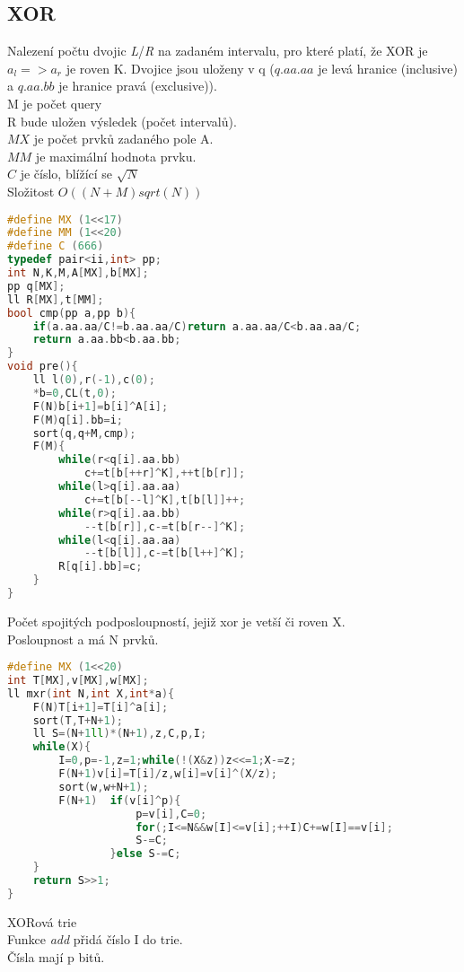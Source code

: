 \documentclass[11pt]{article}
\begin{document}
\subsection{XOR}
Nalezení počtu dvojic \textit{L}/\textit{R} na zadaném intervalu, pro které platí, že XOR je $a_l => a_r$ je roven \textsf{K}. Dvojice jsou uloženy v \textsf{q} ($q.aa.aa$ je levá hranice (inclusive) a $q.aa.bb$ je hranice pravá (exclusive)). 
\\\textsf{M} je počet query
\\\textsf{R} bude uložen výsledek (počet intervalů).
\\$MX$ je počet prvků zadaného pole \textsf{A}.
\\$MM$ je maximální hodnota prvku.
\\$C$ je číslo, blížící se $\sqrt{N}$
\\Složitost $O((N+M)sqrt(N))$ 
\begin{lstlisting}[language=C++]
#define MX (1<<17)
#define MM (1<<20)
#define C (666)
typedef pair<ii,int> pp;
int N,K,M,A[MX],b[MX];
pp q[MX];
ll R[MX],t[MM];
bool cmp(pp a,pp b){
    if(a.aa.aa/C!=b.aa.aa/C)return a.aa.aa/C<b.aa.aa/C;
    return a.aa.bb<b.aa.bb;
}
void pre(){
    ll l(0),r(-1),c(0);
    *b=0,CL(t,0);
    F(N)b[i+1]=b[i]^A[i];
    F(M)q[i].bb=i;
    sort(q,q+M,cmp);
    F(M){
        while(r<q[i].aa.bb)
            c+=t[b[++r]^K],++t[b[r]];
        while(l>q[i].aa.aa)
            c+=t[b[--l]^K],t[b[l]]++;
        while(r>q[i].aa.bb)
            --t[b[r]],c-=t[b[r--]^K];
        while(l<q[i].aa.aa)
            --t[b[l]],c-=t[b[l++]^K];
        R[q[i].bb]=c;    
    }
}
\end{lstlisting}
Počet spojitých podposloupností, jejiž xor je vetší či roven \textsf{X}.
\\Posloupnost \textsf{a} má \textsf{N} prvků.
\begin{lstlisting}[language=C++]
#define MX (1<<20)
int T[MX],v[MX],w[MX];
ll mxr(int N,int X,int*a){
    F(N)T[i+1]=T[i]^a[i];
    sort(T,T+N+1);
    ll S=(N+1ll)*(N+1),z,C,p,I;
    while(X){
        I=0,p=-1,z=1;while(!(X&z))z<<=1;X-=z;
        F(N+1)v[i]=T[i]/z,w[i]=v[i]^(X/z);
        sort(w,w+N+1);
        F(N+1)  if(v[i]^p){
                    p=v[i],C=0;
                    for(;I<=N&&w[I]<=v[i];++I)C+=w[I]==v[i];
                    S-=C;
                }else S-=C;
    }
    return S>>1;
}
\end{lstlisting}
XORová trie
\\Funkce \textit{add} přidá číslo \textsf{I} do trie. 
\\Čísla mají \textsf{p} bitů.
\end{document}

